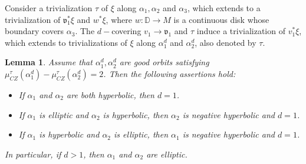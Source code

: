 \documentclass{amsart}
\newcommand{\R}{\mathbb{R}}
\newtheorem{lemma}[theorem]{Lemma}
\newtheorem{definition}[theorem]{Definition}
\newcommand{\CZ}{\mu_{CZ}^{\tau}}
\begin{document}
Consider a trivialization $\tau$ of $\xi$ along $\alpha_1,\alpha_2$ and $\alpha_3$, which extends to a trivialization of $\mathfrak{v}_1^*\xi$ and $ w^*\xi$, where $w:\mathbb{D} \to M$ is a continuous disk whose boundary covers $\alpha_3$. The $d-$covering $v_1 \to \mathfrak{v}_1$ and $\tau$ induce a trivialization of $v_1^*\xi$, which extends to trivializations of $\xi $ along $\alpha_1^d$ and $\alpha_2^d$, also denoted by $\tau$. 

\begin{lemma}\label{odepeq}
Assume that $\alpha_1^d, \alpha_2^d$ are good orbits satisfying $\CZ(\alpha_1^d)-\CZ(\alpha_2^d)=2$. Then the following assertions hold:
\begin{itemize}
    \item[(i)] If $\alpha_1$ and $\alpha_2$ are both hyperbolic, then $d=1$.
    \item[(ii)] If $\alpha_1$ is elliptic and $\alpha_2$ is hyperbolic, then $\alpha_2$ is negative hyperbolic and $d=1$.
    \item[(iii)] If $\alpha_1$ is hyperbolic and $\alpha_2$ is elliptic, then $\alpha_1$ is negative hyperbolic and $d=1$.
\end{itemize}
In particular, if $d>1$, then $\alpha_1$ and $\alpha_2$ are elliptic.
\end{lemma}
\end{document}
